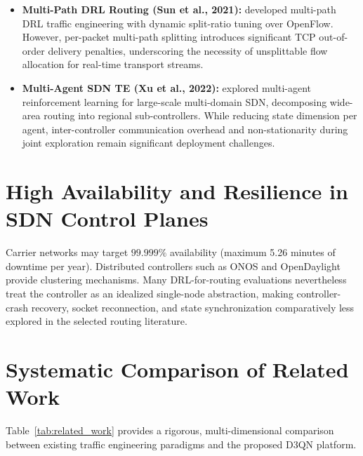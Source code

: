 \documentclass[12pt,a4paper,oneside]{report}
\begin{document}
\begin{itemize}
    \item \textbf{Multi-Path DRL Routing (Sun et al., 2021):} \cite{sun2021multi} developed multi-path DRL traffic engineering with dynamic split-ratio tuning over OpenFlow. However, per-packet multi-path splitting introduces significant TCP out-of-order delivery penalties, underscoring the necessity of unsplittable flow allocation for real-time transport streams.
    \item \textbf{Multi-Agent SDN TE (Xu et al., 2022):} \cite{xu2022multiagent} explored multi-agent reinforcement learning for large-scale multi-domain SDN, decomposing wide-area routing into regional sub-controllers. While reducing state dimension per agent, inter-controller communication overhead and non-stationarity during joint exploration remain significant deployment challenges.
\end{itemize}

\section{High Availability and Resilience in SDN Control Planes}
Carrier networks may target $99.999\%$ availability (maximum 5.26 minutes of downtime per year). Distributed controllers such as ONOS and OpenDaylight provide clustering mechanisms. Many DRL-for-routing evaluations nevertheless treat the controller as an idealized single-node abstraction, making controller-crash recovery, socket reconnection, and state synchronization comparatively less explored in the selected routing literature.

\section{Systematic Comparison of Related Work}
Table~\ref{tab:related_work} provides a rigorous, multi-dimensional comparison between existing traffic engineering paradigms and the proposed D3QN platform.
\end{document}
